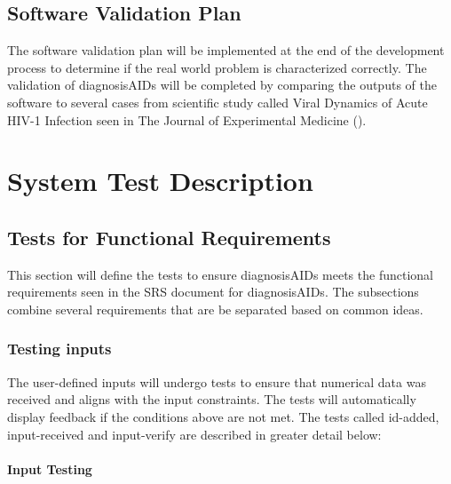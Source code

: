 \documentclass[12pt, titlepage]{article}
\begin{document}
\newpage

\subsection{Software Validation Plan}

The software validation plan will be implemented at the end of the development 
process to determine if the real world problem is characterized correctly. The 
validation of diagnosisAIDs will be completed by comparing the outputs of the 
software to several cases from scientific study called Viral Dynamics of Acute 
HIV-1 Infection seen in The Journal of Experimental Medicine (\citet{viraldynamics}).

\section{System Test Description}
	
\subsection{Tests for Functional Requirements}

This section will define the tests to ensure diagnosisAIDs meets the functional 
requirements seen in the SRS document for diagnosisAIDs. The subsections combine 
several requirements that are be separated based on common ideas.

\subsubsection{Testing inputs}

The user-defined inputs will undergo tests to ensure that numerical data was 
received and aligns with the input constraints. The tests will automatically 
display feedback if the conditions above are not met. The tests called 
id-added, input-received and input-verify are described in greater detail below: 

\paragraph{Input Testing}
\end{document}

